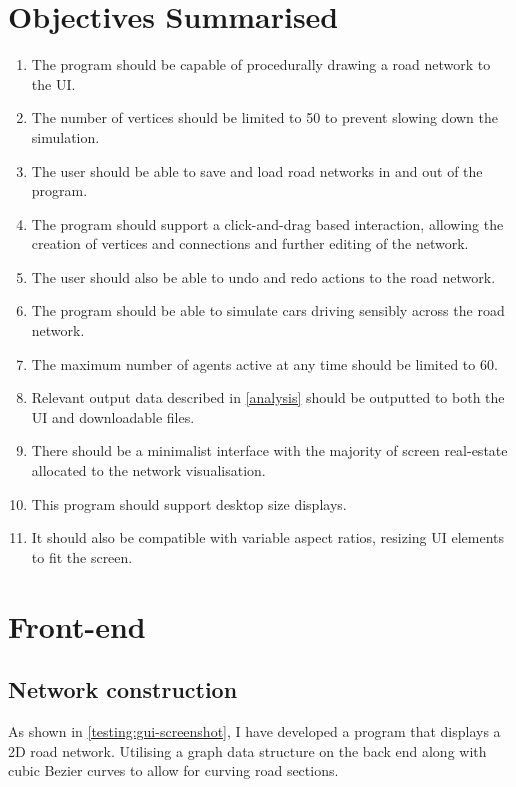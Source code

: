 \section{Objectives Summarised}

\begin{enumerate}
    \item The program should be capable of procedurally drawing a road network to the UI.
    \item The number of vertices should be limited to 50 to prevent slowing down the simulation.
    \item The user should be able to save and load road networks in and out of the program.
    \item The program should support a click-and-drag based interaction, allowing the creation of vertices and connections and further editing of the network.
    \item The user should also be able to undo and redo actions to the road network.
    \item The program should be able to simulate cars driving sensibly across the road network.
    \item The maximum number of agents active at any time should be limited to 60.
    \item Relevant output data described in \autoref{analysis} should be outputted to both the UI and downloadable files.
    \item There should be a minimalist interface with the majority of screen real-estate allocated to the network visualisation.
    \item This program should support desktop size displays.
    \item It should also be compatible with variable aspect ratios, resizing UI elements to fit the screen.
\end{enumerate}

\section{Front-end}

    \subsection{Network construction}

        As shown in \autoref{testing:gui-screenshot}, I have developed a program that displays a 2D road network. Utilising a graph data structure on the back end along with cubic Bezier curves to allow for curving road sections.

